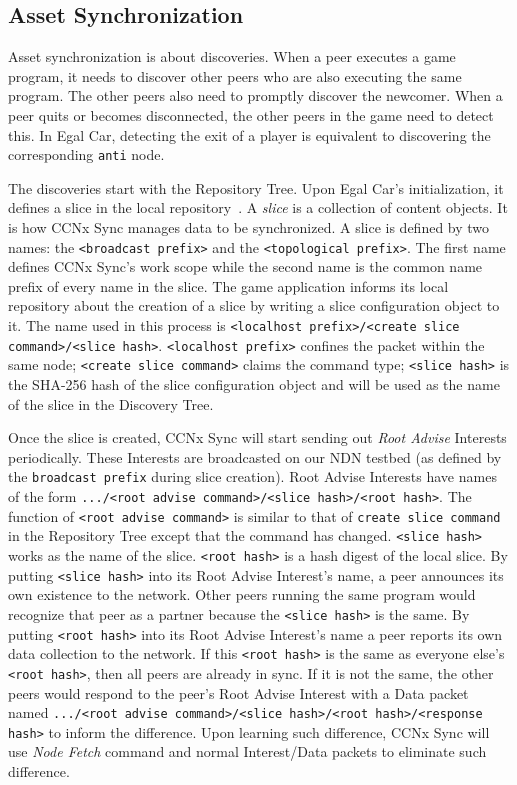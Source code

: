 \documentclass{article}
\begin{document}
\subsection{Asset Synchronization}
\label{assetsynchronization}

Asset synchronization is about discoveries. When a peer executes a game program, it needs to discover other peers who are also executing the same program. The other peers also need to promptly discover the newcomer. When a peer quits or becomes disconnected, the other peers in the game need to detect this. In Egal Car, detecting the exit of a player is equivalent to discovering the corresponding \texttt{anti} node.

The discoveries start with the Repository Tree. Upon Egal Car's initialization, it defines a slice in the local repository~\cite{CCNxCS}. A \emph{slice} is a collection of content objects. It is how CCNx Sync manages data to be synchronized. A slice is defined by two names: the \texttt{<broadcast prefix>} and the \texttt{<topological prefix>}. The first name defines CCNx Sync's work scope while the second name is the common name prefix of every name in the slice. The game application informs its local repository about the creation of a slice by writing a slice configuration object to it. The name used in this process is \texttt{<localhost prefix>/<create slice command>/<slice hash>}. \texttt{<localhost prefix>} confines the packet within the same node; \texttt{<create slice command>} claims the command type; \texttt{<slice hash>} is the SHA-256 hash of the slice configuration object and will be used as the name of the slice in the Discovery Tree.

Once the slice is created, CCNx Sync will start sending out \emph{Root Advise} Interests periodically. These Interests are broadcasted on our NDN testbed (as defined by the \texttt{broadcast prefix} during slice creation). Root Advise Interests have names of the form \texttt{.../<root advise command>/<slice hash>/<root hash>}. The function of \texttt{<root advise command>} is similar to that of \texttt{create slice command} in the Repository Tree except that the command has changed. \texttt{<slice hash>} works as the name of the slice. \texttt{<root hash>} is a hash digest of the local slice. By putting \texttt{<slice hash>} into its Root Advise Interest's name, a peer announces its own existence to the network. Other peers running the same program would recognize that peer as a partner because the \texttt{<slice hash>} is the same. By putting \texttt{<root hash>} into its Root Advise Interest's name a peer reports its own data collection to the network. If this \texttt{<root hash>} is the same as everyone else's \texttt{<root hash>}, then all peers are already in sync. If it is not the same, the other peers would respond to the peer's Root Advise Interest with a Data packet named \texttt{.../<root advise command>/<slice hash>/<root hash>/<response hash>} to inform the difference. Upon learning such difference, CCNx Sync will use \emph{Node Fetch} command and normal Interest/Data packets to eliminate such difference.
\end{document}
